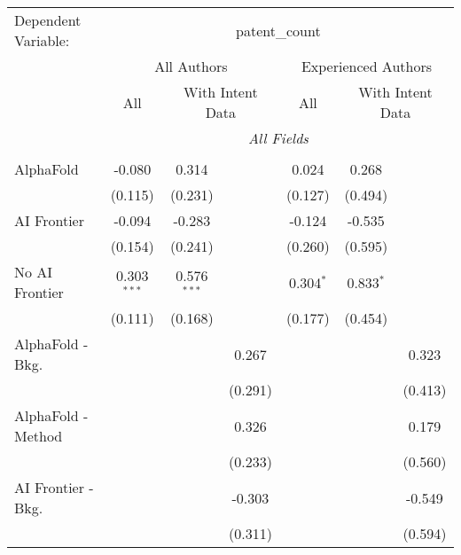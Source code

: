 \begingroup
\centering
\begin{tabular}{lcccccc}
   \tabularnewline \midrule \midrule
   Dependent Variable: & \multicolumn{6}{c}{patent\_count}\\
 & \multicolumn{3}{c}{All Authors} & \multicolumn{3}{c}{Experienced Authors} \\
\cmidrule(lr){2-4} \cmidrule(lr){5-7}
 & \multicolumn{1}{c}{All} & \multicolumn{2}{c}{With Intent Data} & \multicolumn{1}{c}{All} & \multicolumn{2}{c}{With Intent Data} \\
\cmidrule(lr){2-2} \cmidrule(lr){3-4} \cmidrule(lr){5-5} \cmidrule(lr){6-7}
 & \multicolumn{6}{c}{\textit{All Fields}} \\ \\
   AlphaFold               & -0.080        & 0.314         &               & 0.024       & 0.268       &   \\   
                           & (0.115)       & (0.231)       &               & (0.127)     & (0.494)     &   \\   
   AI Frontier             & -0.094        & -0.283        &               & -0.124      & -0.535      &   \\   
                           & (0.154)       & (0.241)       &               & (0.260)     & (0.595)     &   \\   
   No AI Frontier          & 0.303$^{***}$ & 0.576$^{***}$ &               & 0.304$^{*}$ & 0.833$^{*}$ &   \\   
                           & (0.111)       & (0.168)       &               & (0.177)     & (0.454)     &   \\   
   AlphaFold - Bkg.        &               &               & 0.267         &             &             & 0.323\\   
                           &               &               & (0.291)       &             &             & (0.413)\\   
   AlphaFold - Method      &               &               & 0.326         &             &             & 0.179\\   
                           &               &               & (0.233)       &             &             & (0.560)\\   
   AI Frontier - Bkg.      &               &               & -0.303        &             &             & -0.549\\   
                           &               &               & (0.311)       &             &             & (0.594)\\   

\end{tabular}
